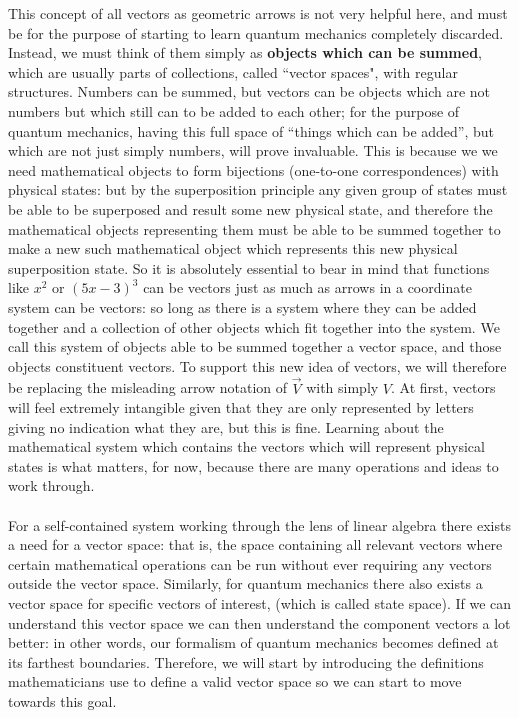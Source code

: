 This concept of all vectors as geometric arrows is not very helpful here, and must be for the purpose of starting to learn quantum mechanics completely discarded. Instead, we must think of them simply as \textbf{objects which can be summed}, which are usually parts of collections, called ``vector spaces", with regular structures. Numbers can be summed, but vectors can be objects which are not numbers but which still can to be added to each other; for the purpose of quantum mechanics, having this full space of ``things which can be added'', but which are not just simply numbers, will prove invaluable. This is because we we need mathematical objects to form bijections (one-to-one correspondences) with physical states: but by the superposition principle any given group of states must be able to be superposed and result some new physical state, and therefore the mathematical objects representing them must be able to be summed together to make a new such mathematical object which represents this new physical superposition state. So it is absolutely essential to bear in mind that functions like $x^2$ or $(5x-3)^{3}$ can be vectors just as much as arrows in a coordinate system can be vectors: so long as there is a system where they can be added together and a collection of other objects which fit together into the system. We call this system of objects able to be summed together a vector space, and those objects constituent vectors. To support this new idea of vectors, we will therefore be replacing the misleading arrow notation of $\vec{V}$  with simply ${V}$. At first, vectors will feel extremely intangible given that they are only represented by letters giving no indication what they are, but this is fine. Learning about the mathematical system which contains the vectors which will represent physical states is what matters, for now, because there are many operations and ideas to work through.
\\\\
For a self-contained system working through the lens of linear algebra there exists a need for a vector space: that is, the space containing all relevant vectors where certain mathematical operations can be run without ever requiring any vectors outside the vector space. Similarly, for quantum mechanics there also exists a vector space for specific vectors of interest, (which is called state space). If we can understand this vector space we can then understand the component vectors a lot better: in other words, our formalism of quantum mechanics becomes defined at its farthest boundaries. Therefore, we will start by introducing the definitions mathematicians use to define a valid vector space so we can start to move towards this goal. 
